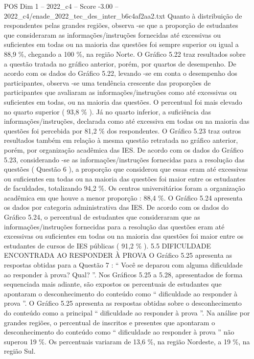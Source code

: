 \begin{textsample}{POS Dim 1 – 2022\_c4 – Score -3.00 – 2022\_c4/enade\_2022\_tec\_des\_inter\_b6c4af2aa2.txt}
Quanto à distribuição de respondentes pelas grandes regiões, observa -se que a proporção de estudantes que consideraram as informações/instruções fornecidas até excessivas ou suficientes em todas ou na maioria das questões foi sempre superior ou igual a 88,9 \%, chegando a 100 \%, na região Norte.
O Gráfico 5.22 traz resultados sobre a questão tratada no gráfico anterior, porém, por quartos de desempenho.
De acordo com os dados do Gráfico 5.22, levando -se em conta o desempenho dos participantes, observa -se uma tendência crescente das proporções de participantes que avaliaram as informações/instruções como até excessivas ou suficientes em todas, ou na maioria das questões.
O percentual foi mais elevado no quarto superior ( 93,8 \% ).
Já no quarto inferior, a suficiência das informações/instruções, declarada como até excessiva em todas ou na maioria das questões foi percebida por 81,2 \% dos respondentes.
O Gráfico 5.23 traz outros resultados também em relação à mesma questão retratada no gráfico anterior, porém, por organização acadêmica das IES.
De acordo com os dados do Gráfico 5.23, considerando -se as informações/instruções fornecidas para a resolução das questões ( Questão 6 ), a proporção que considerou que essas eram até excessivas ou suficientes em todas ou na maioria das questões foi maior entre os estudantes de faculdades, totalizando 94,2 \%.
Os centros universitários foram a organização acadêmica em que houve a menor proporção : 88,4 \%.
O Gráfico 5.24 apresenta os dados por categoria administrativa das IES.
De acordo com os dados do Gráfico 5.24, o percentual de estudantes que consideraram que as informações/instruções fornecidas para a resolução das questões eram até excessivas ou suficientes em todas ou na maioria das questões foi maior entre os estudantes de cursos de IES públicas ( 91,2 \% ). 5.5 DIFICULDADE ENCONTRADA AO RESPONDER À PROVA O Gráfico 5.25 apresenta as respostas obtidas para a Questão 7 : “ Você se deparou com alguma dificuldade ao responder à prova?
Qual? ”.
Nos Gráficos 5.25 a 5.28, apresentados de forma sequenciada mais adiante, são expostos os percentuais de estudantes que apontaram o desconhecimento do conteúdo como “ dificuldade ao responder à prova ”.
O Gráfico 5.25 apresenta as respostas obtidas sobre o desconhecimento do conteúdo como a principal “ dificuldade ao responder à prova ”.
Na análise por grandes regiões, o percentual de inscritos e presentes que apontaram o desconhecimento do conteúdo como “ dificuldade ao responder à prova ” não superou 19 \%.
Os percentuais variaram de 13,6 \%, na região Nordeste, a 19 \%, na região Sul.

\end{textsample}
